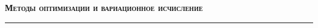 \documentclass[12pt]{article}
\theoremstyle{example}
\theoremstyle{plain}
\theoremstyle{definition}
\theoremstyle{remark}
\numberwithin{remark}{section}
\begin{document}
	
	\begin{center}
		\LARGE \bf	
		\textsc{Методы оптимизации и вариационное исчисление}
		\rule{\textwidth}{0.4pt}
	\end{center}
	
	
	
	
\end{document}
